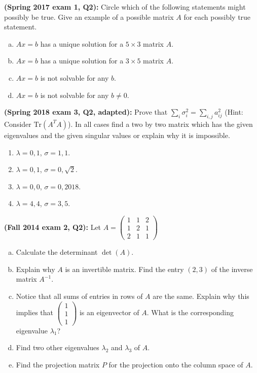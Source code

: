 \documentclass[11pt]{article}
\begin{document}
\noindent \textbf{(Spring 2017 exam 1, Q2):} Circle which of the following statements might possibly be true. Give an example of a possible matrix $A$ for each possibly true statement.
\begin{enumerate}[(a)]
\item $Ax = b$ has a unique solution for a $5 \times 3$ matrix $A$.
\item $Ax = b$ has a unique solution for a $3 \times 5$ matrix $A$.
\item  $Ax = b$ is not solvable for any $b$.
\item $Ax = b$ is not solvable for any $b \neq 0$.
\end{enumerate}

\newpage

\noindent \textbf{(Spring 2018 exam 3, Q2, adapted):} Prove that $\sum_{i} \sigma_i^2 = \sum_{i,j} a_{ij}^2$ (Hint: Consider $\text{Tr}(A^TA)$). In all cases find a two by two matrix which has the given eigenvalues and the given singular values or explain why it is impossible. 
\begin{enumerate}
\item $\lambda = 0, 1$, $\sigma = 1, 1$.
\item  $\lambda = 0, 1$,  $\sigma = 0, \sqrt{2}$. 
\item $\lambda = 0, 0$,  $\sigma = 0, 2018$.
\item  $\lambda = 4, 4$,  $\sigma = 3, 5$.
\end{enumerate}

\newpage

\noindent \textbf{(Fall 2014 exam 2, Q2):}  Let $A = \begin{pmatrix} 1 & 1 & 2 \\  1 & 2 & 1 \\ 2 & 1 & 1 \end{pmatrix}$
\begin{enumerate}[(a)]
\item Calculate the determinant $\det(A)$.
\item Explain why $A$ is an invertible matrix. Find the entry $(2, 3)$ of the inverse matrix $A^{-1}$.
\item Notice that all sums of entries in rows of $A$ are the same. Explain why this implies that $\begin{pmatrix} 1 \\ 1 \\1 \end{pmatrix}$ is an eigenvector of $A$. What is the corresponding eigenvalue $\lambda_1$?
\item Find two other eigenvalues $\lambda_2$ and $\lambda_3$ of $A$.
\item Find the projection matrix $P$ for the projection onto the column space of $A$.
\end{enumerate}
\end{document}
